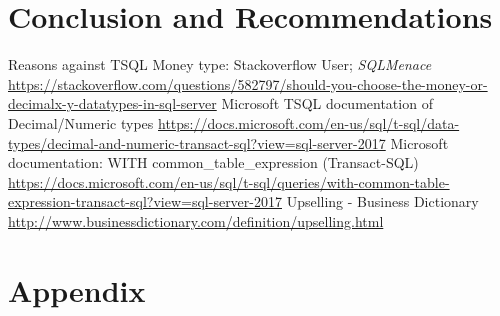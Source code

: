 \documentclass{article}
\begin{document}
    \section{Conclusion and Recommendations}

    
    \newpage
    \begin{thebibliography}{9}
        \raggedright
            Reasons against TSQL Money type: Stackoverflow User; \textit{SQLMenace}
            \url{https://stackoverflow.com/questions/582797/should-you-choose-the-money-or-decimalx-y-datatypes-in-sql-server}
            Microsoft TSQL documentation of Decimal/Numeric types
            \url{https://docs.microsoft.com/en-us/sql/t-sql/data-types/decimal-and-numeric-transact-sql?view=sql-server-2017}
        Microsoft documentation: WITH common\_table\_expression (Transact-SQL)
            \url{https://docs.microsoft.com/en-us/sql/t-sql/queries/with-common-table-expression-transact-sql?view=sql-server-2017}
        		Upselling - Business Dictionary
        		\url{http://www.businessdictionary.com/definition/upselling.html}
    \end{thebibliography}


    \newpage
    \section{Appendix}
    \label{sec:Appendix}
    
    
\end{document}

